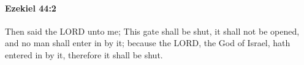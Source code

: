 
		\paragraph{Ezekiel 44:2} %
			\label{EZEKIEL-44-2}

			Then said the LORD unto me; This gate shall be shut, it shall not be opened, and no man shall enter in by it; because the LORD, the God of Israel, hath entered in by it, therefore it shall be shut.


